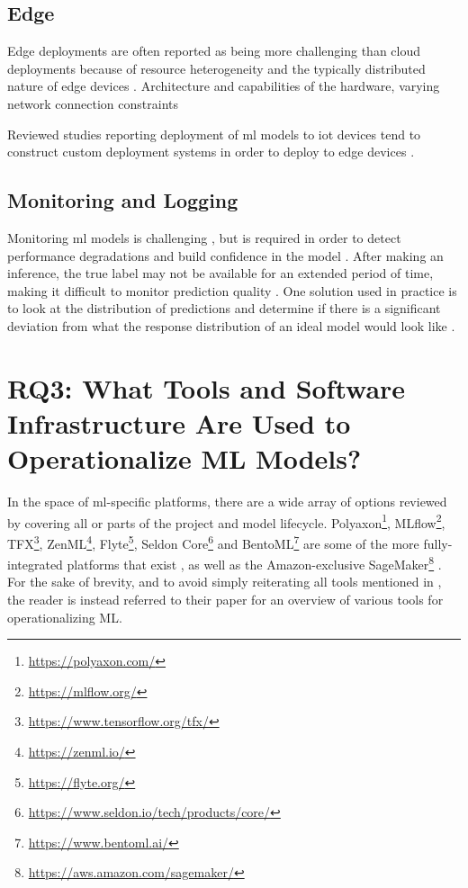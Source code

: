 \subsection{Edge}
\label{ch:results:rq2:edge}
Edge deployments are often reported as being more challenging than cloud deployments because of resource heterogeneity and the typically distributed nature of edge devices \cite{Chen2020, Bosch2021, Yadwadkar2019, Gupta2020, Hummer2019}.
Architecture and capabilities of the hardware, varying network connection constraints

Reviewed studies reporting deployment of \acrshort{ml} models to \acrfull{iot} devices tend to construct custom deployment systems in order to deploy to edge devices \cite{Peticolas2019}.

\subsection{Monitoring and Logging}
Monitoring \acrshort{ml} models is challenging \cite{Li2017, Bernardi2019}, but is required in order to detect performance degradations and build confidence in the model \cite{Bosch2021, Chen2020}.
After making an inference, the true label may not be available for an extended period of time, making it difficult to monitor prediction quality \cite{Bernardi2019}.
One solution used in practice is to look at the distribution of predictions and determine if there is a significant deviation from what the response distribution of an ideal model would look like \cite{Bernardi2019}.

\section{RQ3: What Tools and Software Infrastructure Are Used to Operationalize ML Models?}
\label{ch:research_results:rq3_tools_infrastructure}
In the space of \acrshort{ml}-specific platforms, there are a wide array of options reviewed by \cite{Ruf2021} covering all or parts of the project and model lifecycle.
Polyaxon\footnote{\url{https://polyaxon.com/}}, MLflow\footnote{\url{https://mlflow.org/}}, TFX\footnote{\url{https://www.tensorflow.org/tfx/}}, ZenML\footnote{\url{https://zenml.io/}}, Flyte\footnote{\url{https://flyte.org/}}, Seldon Core\footnote{\url{https://www.seldon.io/tech/products/core/}} and BentoML\footnote{\url{https://www.bentoml.ai/}} are some of the more fully-integrated platforms that exist \cite{Chen2020, Ruf2021}, as well as the Amazon-exclusive SageMaker\footnote{\url{https://aws.amazon.com/sagemaker/}} \cite{Ruf2021, Chahal2020}.
For the sake of brevity, and to avoid simply reiterating all tools mentioned in \cite{Ruf2021}, the reader is instead referred to their paper for an overview of various tools for operationalizing ML.

